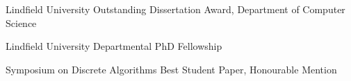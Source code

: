 {%
	Lindfield University}
{%
	Outstanding Dissertation Award, Department of Computer Science}
{}

{%
	Lindfield University}
{%
	Departmental PhD Fellowship}
{}

{%
	Symposium on Discrete Algorithms}
{%
	Best Student Paper, Honourable Mention}
{}
